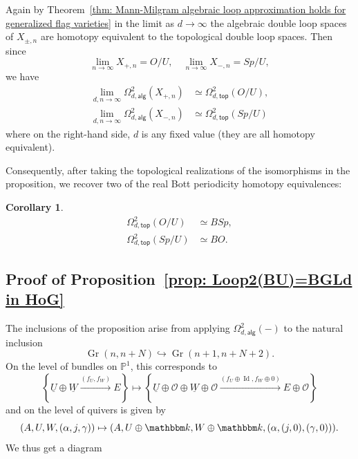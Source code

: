 \message{ !name(Bryan-Vakil.tex)}\documentclass{amsart}
\newtheorem{corollary}[theorem]{Corollary}
\theoremstyle{definition}
\newcommand{\kk} {{\mathbbm k}}
\newcommand{\PP}{\mathbb{P}}
\newcommand{\OO}{\mathcal{O}}
\newcommand{\UL}[1]{\underline{#1}}
\newcommand{\alg}{\mathsf{alg}}
\renewcommand{\top}{\mathsf{top}}
\newcommand{\Gr}{\operatorname{Gr}}
\newcommand{\LoopTwo}{\Omega^{2}_{d,\alg}}
\newcommand{\LoopTwoTop}{\Omega^{2}_{d,\top}}
\newcommand{\Id}{\operatorname{Id}}
\newcommand{\homotopyeq}{\simeq}
\begin{document}
Again by Theorem~\ref{thm: Mann-Milgram algebraic loop approximation
holds for generalized flag varieties} in the limit as $d\to \infty$
the algebraic double loop spaces of $X_{\pm,n}$ are homotopy
equivalent to the topological double loop spaces. Then since 
\[
\lim_{n\to \infty}X_{+,n} = O/U, \quad \lim_{n\to \infty}X_{-,n} = Sp/U, 
\]
we have
\begin{align*}
\lim_{d,n\to \infty} \LoopTwo (X_{+,n}) & \homotopyeq \LoopTwoTop (O/U),\\
\lim_{d,n\to \infty} \LoopTwo (X_{-,n}) & \homotopyeq \LoopTwoTop (Sp/U)
\end{align*}
where on the right-hand side, $d$ is any fixed value (they are all
homotopy equivalent).

Consequently, after taking the topological realizations of the
isomorphisms in the proposition, we recover two of the real Bott
periodicity homotopy equivalences:
\begin{corollary}
\begin{align*}
\LoopTwoTop (O/U)& \homotopyeq BSp,\\
\LoopTwoTop (Sp/U)& \homotopyeq BO.
\end{align*}
\end{corollary}

\subsection{Proof of Proposition~\ref{prop: Loop2(BU)=BGLd in HoG}}

The inclusions 
of the proposition arise from applying $\LoopTwo (-)$ to
the natural inclusion
\[
\Gr (n,n+N)\hookrightarrow \Gr (n+1,n+N+2). 
\]
On the level of bundles on $\PP^{1}$, this corresponds to 
\[
\left\{\UL{U}\oplus \UL{W} \xrightarrow{(f_{U},f_{W})}E
\right\}\mapsto \left\{\UL{U}\oplus \OO \oplus \UL{W}\oplus \OO
\xrightarrow{(f_{U}\oplus \Id ,f_{W}\oplus 0)}E\oplus \OO
\right\}
\]
and on the level of quivers is given by
\[
(A,U,W,(\alpha ,j,\gamma ))\mapsto (A,U\oplus \kk ,W\oplus \kk ,(\alpha ,(j,0),(\gamma ,0))).
\]
We thus get a diagram
\end{document}
